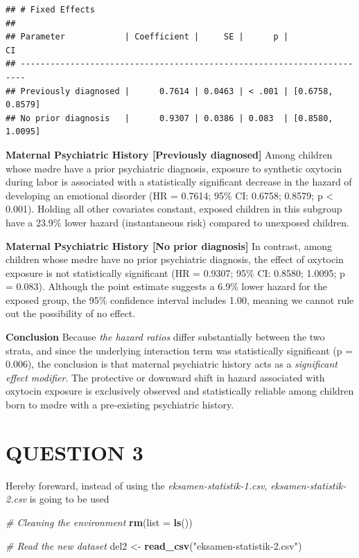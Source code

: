 \documentclass[
]{article}
\newenvironment{Shaded}{\begin{snugshade}}{\end{snugshade}}
\newcommand{\AttributeTok}[1]{\textcolor[rgb]{0.13,0.29,0.53}{#1}}
\newcommand{\CommentTok}[1]{\textcolor[rgb]{0.56,0.35,0.01}{\textit{#1}}}
\newcommand{\FunctionTok}[1]{\textcolor[rgb]{0.13,0.29,0.53}{\textbf{#1}}}
\newcommand{\NormalTok}[1]{#1}
\newcommand{\OtherTok}[1]{\textcolor[rgb]{0.56,0.35,0.01}{#1}}
\newcommand{\StringTok}[1]{\textcolor[rgb]{0.31,0.60,0.02}{#1}}
\begin{document}
\begin{verbatim}
## # Fixed Effects
## 
## Parameter            | Coefficient |     SE |      p |               CI
## -----------------------------------------------------------------------
## Previously diagnosed |      0.7614 | 0.0463 | < .001 | [0.6758, 0.8579]
## No prior diagnosis   |      0.9307 | 0.0386 | 0.083  | [0.8580, 1.0095]
\end{verbatim}

\textbf{Maternal Psychiatric History {[}Previously diagnosed{]}} Among
children whose mødre have a prior psychiatric diagnosis, exposure to
synthetic oxytocin during labor is associated with a statistically
significant decrease in the hazard of developing an emotional disorder
(HR = 0.7614; 95\% CI: 0.6758; 0.8579; p \textless{} 0.001). Holding all
other covariates constant, exposed children in this subgroup have a
23.9\% lower hazard (instantaneous risk) compared to unexposed children.

\textbf{Maternal Psychiatric History {[}No prior diagnosis{]}} In
contrast, among children whose mødre have no prior psychiatric
diagnosis, the effect of oxytocin exposure is not statistically
significant (HR = 0.9307; 95\% CI: 0.8580; 1.0095; p = 0.083). Although
the point estimate suggests a 6.9\% lower hazard for the exposed group,
the 95\% confidence interval includes 1.00, meaning we cannot rule out
the possibility of no effect.

\textbf{Conclusion} Because \emph{the hazard ratios} differ
substantially between the two strata, and since the underlying
interaction term was statistically significant (p = 0.006), the
conclusion is that maternal psychiatric history acts as a
\emph{significant effect modifier}. The protective or downward shift in
hazard associated with oxytocin exposure is exclusively observed and
statistically reliable among children born to mødre with a pre-existing
psychiatric history.

\section{QUESTION 3}\label{question-3}

Hereby foreward, instead of using the \emph{eksamen-statistik-1.csv},
\emph{eksamen-statistik-2.csv} is going to be used

\begin{Shaded}
\begin{Highlighting}[]
\CommentTok{\# Cleaning the environment }
\FunctionTok{rm}\NormalTok{(}\AttributeTok{list =} \FunctionTok{ls}\NormalTok{())}

\CommentTok{\# Read the new dataset }
\NormalTok{del2 }\OtherTok{\textless{}{-}} \FunctionTok{read\_csv}\NormalTok{(}\StringTok{"eksamen{-}statistik{-}2.csv"}\NormalTok{)}
\end{Highlighting}
\end{Shaded}
\end{document}
